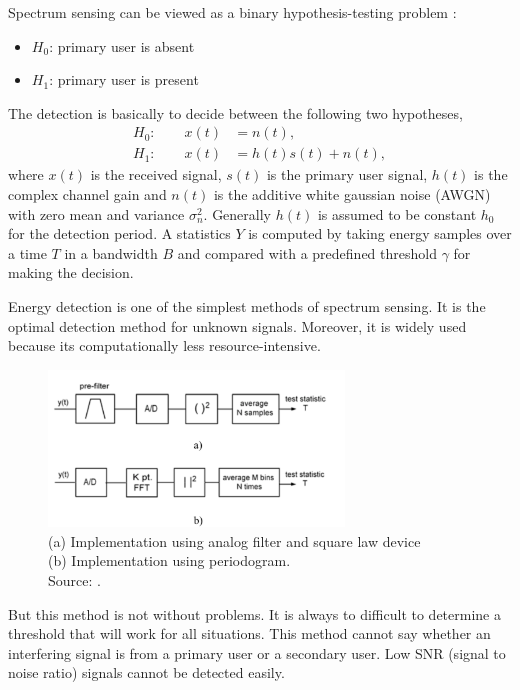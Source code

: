 Spectrum sensing can be viewed as a binary hypothesis-testing problem 
\cite{zhang09}:
\begin{itemize}[noitemsep,topsep=0pt,parsep=0pt,partopsep=0pt]
    \item $H_0$: primary user is absent
    \item $H_1$: primary user is present
\end{itemize}
The detection is basically to decide between the following two hypotheses,
\begin{align}
    H_0 : \qquad x(t) &= n(t),  \nonumber \\
    H_1 : \qquad x(t) &= h(t)s(t) + n(t),  \nonumber
\end{align}
where $x(t)$ is the received signal, $s(t)$ is the primary user signal, $h(t)$
is the complex channel gain and $n(t)$ is the additive white gaussian noise
(AWGN) with zero mean and variance $\sigma_n^2$. Generally $h(t)$ is assumed
to be constant $h_0$ for the detection period. A statistics $Y$ is computed by
taking energy samples over a time $T$ in a bandwidth $B$ and compared with a 
predefined threshold $\gamma$ for making the decision.

Energy detection is one of the simplest methods of spectrum sensing. It is the 
optimal detection method for unknown signals. Moreover, it is widely used 
because its computationally less resource-intensive.

\begin{figure}
    \centering
    \includegraphics[width=0.7\textwidth]{../images/energyDetection}
    \caption[Energy Detection block diagram]{(a) Implementation using analog 
    filter and square law device \\
    (b) Implementation using periodogram. \\
    Source: {\cite{cabric06}}.}
    \label{energyDetection}
\end{figure}

But this method is not without problems. It is always to difficult to 
determine a threshold that will work for all situations. This method cannot
say whether an interfering signal is from a primary user or a secondary user.
Low SNR (signal to noise ratio) signals cannot be detected easily.

